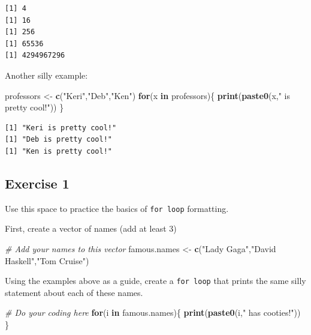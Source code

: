 \documentclass[
]{book}
\newenvironment{Shaded}{\begin{snugshade}}{\end{snugshade}}
\newcommand{\CommentTok}[1]{\textcolor[rgb]{0.56,0.35,0.01}{\textit{#1}}}
\newcommand{\ControlFlowTok}[1]{\textcolor[rgb]{0.13,0.29,0.53}{\textbf{#1}}}
\newcommand{\KeywordTok}[1]{\textcolor[rgb]{0.13,0.29,0.53}{\textbf{#1}}}
\newcommand{\NormalTok}[1]{#1}
\newcommand{\StringTok}[1]{\textcolor[rgb]{0.31,0.60,0.02}{#1}}
\begin{document}
\begin{verbatim}
[1] 4
[1] 16
[1] 256
[1] 65536
[1] 4294967296
\end{verbatim}

Another silly example:

\begin{Shaded}
\begin{Highlighting}[]
\NormalTok{professors <-}\StringTok{ }\KeywordTok{c}\NormalTok{(}\StringTok{"Keri"}\NormalTok{,}\StringTok{"Deb"}\NormalTok{,}\StringTok{"Ken"}\NormalTok{) }
\ControlFlowTok{for}\NormalTok{(x }\ControlFlowTok{in}\NormalTok{ professors)\{}
  \KeywordTok{print}\NormalTok{(}\KeywordTok{paste0}\NormalTok{(x,}\StringTok{" is pretty cool!"}\NormalTok{))}
\NormalTok{\}}
\end{Highlighting}
\end{Shaded}

\begin{verbatim}
[1] "Keri is pretty cool!"
[1] "Deb is pretty cool!"
[1] "Ken is pretty cool!"
\end{verbatim}

\hypertarget{exercise-1-4}{%
\subsection*{Exercise 1}\label{exercise-1-4}}

Use this space to practice the basics of \texttt{for\ loop} formatting.

First, create a vector of names (add at least 3)

\begin{Shaded}
\begin{Highlighting}[]
\CommentTok{# Add your names to this vector}
\NormalTok{famous.names <-}\StringTok{ }\KeywordTok{c}\NormalTok{(}\StringTok{"Lady Gaga"}\NormalTok{,}\StringTok{"David Haskell"}\NormalTok{,}\StringTok{"Tom Cruise"}\NormalTok{)}
\end{Highlighting}
\end{Shaded}

Using the examples above as a guide, create a \texttt{for\ loop} that prints the same silly statement about each of these names.

\begin{Shaded}
\begin{Highlighting}[]
\CommentTok{# Do your coding here}
\ControlFlowTok{for}\NormalTok{(i }\ControlFlowTok{in}\NormalTok{ famous.names)\{}
  \KeywordTok{print}\NormalTok{(}\KeywordTok{paste0}\NormalTok{(i,}\StringTok{" has cooties!"}\NormalTok{))}
\NormalTok{\}}
\end{Highlighting}
\end{Shaded}
\end{document}
